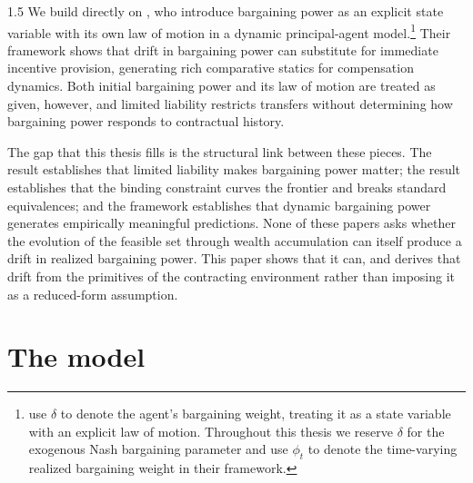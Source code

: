 \documentclass[12pt]{article}
\theoremstyle{definition}
\theoremstyle{plain}
\begin{document}
\begin{spacing}{1.5}
We build directly on \textcite{digiannatale2025}, who introduce bargaining power as an explicit state variable with its own law of motion in a dynamic principal-agent model.\footnote{\textcite{digiannatale2025} use $\delta$ to denote the agent's bargaining weight, treating it as a state variable with an explicit law of motion. Throughout this thesis we reserve $\delta$ for the exogenous Nash bargaining parameter and use $\phi_t$ to denote the time-varying realized bargaining weight in their framework.} Their framework shows that drift in bargaining power can substitute for immediate incentive provision, generating rich comparative statics for compensation dynamics. Both initial bargaining power and its law of motion are treated as given, however, and limited liability restricts transfers without determining how bargaining power responds to contractual history. 

The gap that this thesis fills is the structural link between these pieces. The \textcite{pitchford1998} result establishes that limited liability makes bargaining power matter; the \textcite{demougin2006} result establishes that the binding constraint curves the frontier and breaks standard equivalences; and the \textcite{digiannatale2025} framework establishes that dynamic bargaining power generates empirically meaningful predictions. None of these papers asks whether the evolution of the feasible set through  wealth accumulation can itself produce a drift in realized bargaining power. This paper shows that it can, and derives that drift from the primitives of the contracting environment rather than imposing it as a reduced-form assumption.

\newpage 
\section{The model}\label{Model}


\end{spacing}
\end{document}
